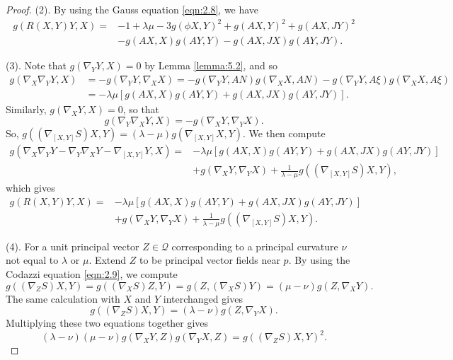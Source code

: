 \documentclass[10pt,a4paper]{amsart}
\begin{document}
\begin{proof}
(2). By using the Gauss equation \eqref{eqn:2.8}, we have
%
\begin{equation}\label{eqn:5.2}
\begin{aligned}
g(R(X,Y)Y,X)=&-1+\lambda\mu-3g(\phi X,Y)^2+g(AX,Y)^2+g(AX,JY)^2\\
&-g(AX,X)g(AY,Y)-g(AX,JX)g(AY,JY).
\end{aligned}
\end{equation}

(3). Note that $g(\nabla_Y Y,X)=0$ by Lemma \ref{lemma:5.2}, and so
$$
\begin{aligned}
g(\nabla_X {\nabla_Y Y},X)&=-g(\nabla_Y Y,\nabla_X X)=-g(\nabla_Y Y,AN)g(\nabla_X X,AN)-g(\nabla_Y Y,A\xi)g(\nabla_X X,A\xi)\\
&=-\lambda\mu [g(AX,X)g(AY,Y)+g(AX,JX)g(AY,JY)].
\end{aligned}
$$
Similarly, $g(\nabla_X Y,X)=0$, so that
$$
g(\nabla_Y {\nabla_X Y},X)=-g(\nabla_X Y,\nabla_Y X).
$$
So, $g((\nabla_{[X,Y]} S)X,Y)=(\lambda-\mu)g(\nabla_{[X,Y]} X,Y)$. We then compute
$$
\begin{aligned}
g(\nabla_X{\nabla_Y Y}-\nabla_Y {\nabla_X Y}-\nabla_{[X,Y]} Y,X)=&-\lambda\mu [g(AX,X)g(AY,Y)+g(AX,JX)g(AY,JY)]\\
&+g(\nabla_X Y,\nabla_Y X)
+\frac{1}{\lambda-\mu}g((\nabla_{[X,Y]} S)X,Y),
\end{aligned}
$$
which gives
\begin{equation}\label{eqn:5.3}
\begin{aligned}
g(R(X,Y)Y,X)=&-\lambda\mu[g(AX,X)g(AY,Y)+g(AX,JX)g(AY,JY)]\\
&+g(\nabla_X Y,\nabla_Y X)+\frac{1}{\lambda-\mu}g((\nabla_{[X,Y]} S)X,Y).
\end{aligned}
\end{equation}

(4). For a unit principal vector $Z\in \mathcal{Q}$
corresponding to a principal curvature $\nu$ not equal to $\lambda$ or $\mu$. Extend $Z$ to be principal vector fields near $p$.
By using the Codazzi equation \eqref{eqn:2.9}, we compute
$$
g((\nabla_Z S)X,Y)=g((\nabla_X S)Z,Y)=g(Z,(\nabla_X S)Y)=(\mu-\nu)g(Z,\nabla_X Y).
$$
The same calculation with $X$ and $Y$ interchanged gives
$$
g((\nabla_Z S)X,Y)=(\lambda-\nu)g(Z,\nabla_Y X).
$$
Multiplying these two equations together gives
%
\begin{equation}\label{eqn:5.4}
(\lambda-\nu)(\mu-\nu)g(\nabla_X Y,Z)g(\nabla_Y X,Z)=g((\nabla_Z S)X,Y)^2.
\end{equation}


\end{proof}
\end{document}
